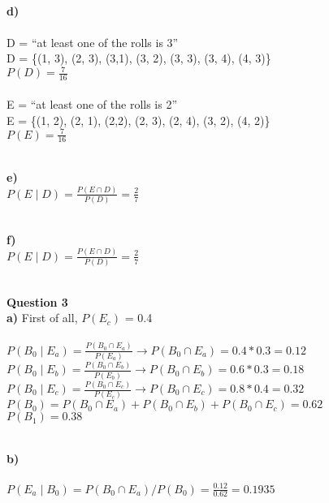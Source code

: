 \documentclass{METUHW} %
\begin{document}
\raggedright
\text{}\\
\textbf{d)}\\
\text{}\\
\centering 
 D = “at least one of the rolls is 3”\\
 D = \{(1, 3), (2, 3), (3,1), (3, 2), (3, 3), (3, 4), (4, 3)\} \\
 $P(D) = \frac{7}{16}$
 \text{}\\
 \text{}\\
 E = “at least one of the rolls is 2”\\
 E = \{(1, 2), (2, 1), (2,2), (2, 3), (2, 4), (3, 2), (4, 2)\} \\
 $P(E) = \frac{7}{16}$
\text{}\\
\text{}\\
\raggedright
\textbf{e)}\\
\centering
$P(E \mid D) = \frac{P(E \cap D)}{P(D)} = \frac{2}{7}$\\

\raggedright
\text{}\\
\textbf{f)}\\
\centering
$P(E \mid D) = \frac{P(E \cap D)}{P(D)} = \frac{2}{7}$\\

\raggedright
\text{}\\
\textbf{\large Question 3}\\
\textbf{a)} First of all, $P(E_c)$ = 0.4\\
\text{}\\
\centering
$P(B_0 \mid E_a) = \frac{P(B_0 \cap E_a)}{P(E_a)}  \rightarrow  P(B_0 \cap E_a) = 0.4*0.3 = 0.12$\\

$P(B_0 \mid E_b) = \frac{P(B_0 \cap E_b)}{P(E_b)}  \rightarrow  P(B_0 \cap E_b) = 0.6*0.3 = 0.18$\\
$P(B_0 \mid E_c) = \frac{P(B_0 \cap E_c)}{P(E_c)}  \rightarrow  P(B_0 \cap E_c) = 0.8*0.4 = 0.32$\\
$P(B_0) = P(B_0 \cap E_a) + P(B_0 \cap E_b) + P(B_0 \cap E_c) = 0.62$\\
$P(B_1) = 0.38$\\
\text{}\\

\raggedright

\textbf{b)}\\
\centering\\
$P(E_a\mid B_0)= P(B_0\cap E_a)/P(B_0)  = \frac{0.12}{0.62} = 0.1935$

\raggedright
\end{document}
